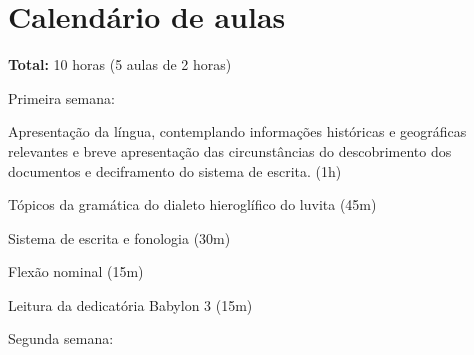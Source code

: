 \documentclass[article,12pt]{memoir}
\begin{document}
\hypertarget{calenduxe1rio-de-aulas}{%
	\chapter{Calendário de aulas}\label{calenduxe1rio-de-aulas}}

\textbf{Total:} 10 horas (5 aulas de 2 horas)

\begin{compactitem}
	\item Primeira semana:
	\begin{compactitem}
		\item Apresentação da língua, contemplando informações históricas e
		geográficas relevantes e breve apresentação das circunstâncias do
		descobrimento dos documentos e deciframento do sistema de escrita.
		(1h)
		\item Tópicos da gramática do dialeto hieroglífico do luvita (45m)

		\begin{compactitem}
			\item Sistema de escrita e fonologia (30m)
			\item Flexão nominal (15m)
		\end{compactitem}
		\item Leitura da dedicatória Babylon 3 (15m)
	\end{compactitem}
	\item Segunda semana:


\end{compactitem}
\end{document}
